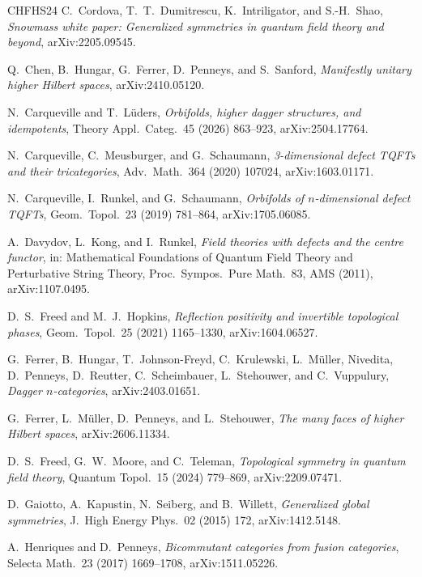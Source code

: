 \documentclass[11pt]{article}
\theoremstyle{definition}
\begin{document}
\begin{thebibliography}{CHFHS24}
C.~Cordova, T.~T.~Dumitrescu, K.~Intriligator, and S.-H.~Shao,
\emph{Snowmass white paper: Generalized symmetries in quantum field theory and beyond},
arXiv:2205.09545.

Q.~Chen, B.~Hungar, G.~Ferrer, D.~Penneys, and S.~Sanford,
\emph{Manifestly unitary higher Hilbert spaces},
arXiv:2410.05120.

N.~Carqueville and T.~L\"uders,
\emph{Orbifolds, higher dagger structures, and idempotents},
Theory Appl.\ Categ.\ 45 (2026) 863--923,
arXiv:2504.17764.

N.~Carqueville, C.~Meusburger, and G.~Schaumann,
\emph{3-dimensional defect TQFTs and their tricategories},
Adv.\ Math.\ 364 (2020) 107024,
arXiv:1603.01171.

N.~Carqueville, I.~Runkel, and G.~Schaumann,
\emph{Orbifolds of $n$-dimensional defect TQFTs},
Geom.\ Topol.\ 23 (2019) 781--864,
arXiv:1705.06085.

A.~Davydov, L.~Kong, and I.~Runkel,
\emph{Field theories with defects and the centre functor},
in: Mathematical Foundations of Quantum Field Theory and Perturbative String Theory,
Proc.\ Sympos.\ Pure Math.\ 83, AMS (2011),
arXiv:1107.0495.

D.~S.~Freed and M.~J.~Hopkins,
\emph{Reflection positivity and invertible topological phases},
Geom.\ Topol.\ 25 (2021) 1165--1330,
arXiv:1604.06527.

G.~Ferrer, B.~Hungar, T.~Johnson-Freyd, C.~Krulewski, L.~M\"uller, Nivedita, D.~Penneys, D.~Reutter, C.~Scheimbauer, L.~Stehouwer, and C.~Vuppulury,
\emph{Dagger $n$-categories},
arXiv:2403.01651.

G.~Ferrer, L.~M\"uller, D.~Penneys, and L.~Stehouwer,
\emph{The many faces of higher Hilbert spaces},
arXiv:2606.11334.

D.~S.~Freed, G.~W.~Moore, and C.~Teleman,
\emph{Topological symmetry in quantum field theory},
Quantum Topol.\ 15 (2024) 779--869,
arXiv:2209.07471.

D.~Gaiotto, A.~Kapustin, N.~Seiberg, and B.~Willett,
\emph{Generalized global symmetries},
J.\ High Energy Phys.\ 02 (2015) 172,
arXiv:1412.5148.

A.~Henriques and D.~Penneys,
\emph{Bicommutant categories from fusion categories},
Selecta Math.\ 23 (2017) 1669--1708,
arXiv:1511.05226.


\end{thebibliography}
\end{document}
